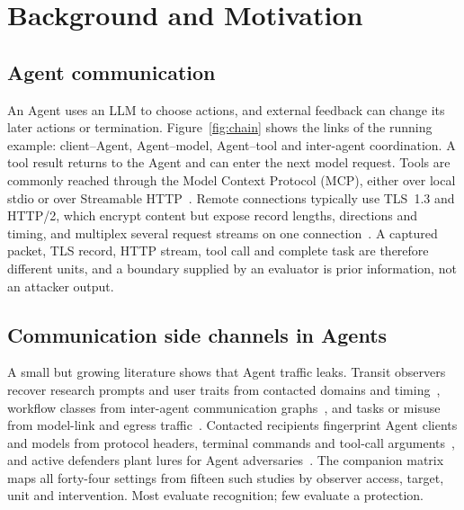 \section{Background and Motivation}\label{sec:background}

\subsection{Agent communication}
An Agent uses an LLM to choose actions, and external feedback can change its later actions or termination. Figure~\ref{fig:chain} shows the links of the running example: client--Agent, Agent--model, Agent--tool and inter-agent coordination. A tool result returns to the Agent and can enter the next model request. Tools are commonly reached through the Model Context Protocol (MCP), either over local stdio or over Streamable HTTP~\cite{mcp2025transports}. Remote connections typically use TLS~1.3 and HTTP/2, which encrypt content but expose record lengths, directions and timing, and multiplex several request streams on one connection~\cite{rfc8446,rfc9113}. A captured packet, TLS record, HTTP stream, tool call and complete task are therefore different units, and a boundary supplied by an evaluator is prior information, not an attacker output.

\subsection{Communication side channels in Agents}
A small but growing literature shows that Agent traffic leaks. Transit observers recover research prompts and user traits from contacted domains and timing~\cite{jeong2026wra}, workflow classes from inter-agent communication graphs~\cite{dangol2026workflow}, and tasks or misuse from model-link and egress traffic~\cite{pouryousef2026traffic,li2026ant,agentprint2025}. Contacted recipients fingerprint Agent clients and models from protocol headers, terminal commands and tool-call arguments~\cite{kang2026whoseagent,fayolle2026webagents,ediga2026trace,zhao2026agenttrace,duan2026privacytrace}, and active defenders plant lures for Agent adversaries~\cite{ayzenshteyn2025cheat,reworr2024honeypot}. The companion matrix maps all forty-four settings from fifteen such studies by observer access, target, unit and intervention. Most evaluate recognition; few evaluate a protection.

